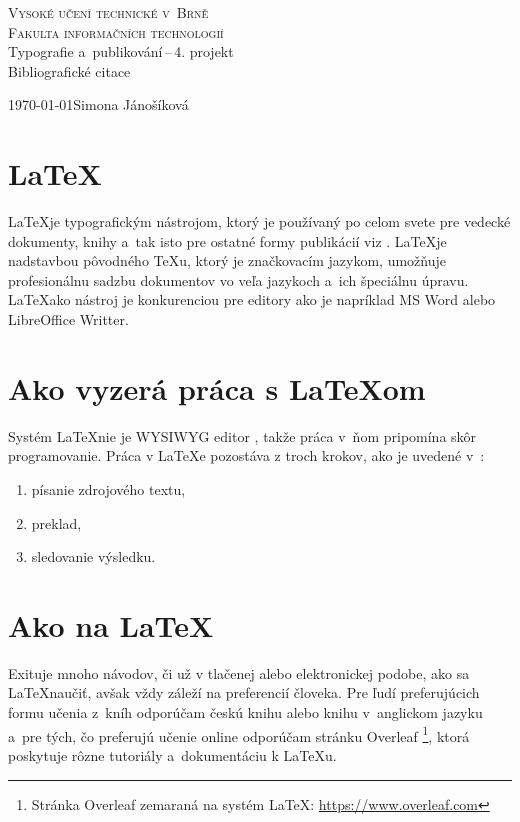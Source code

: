\documentclass[a4paper, 11pt]{article}
\begin{document}
\begin{titlepage}
    \begin{center}
       \textsc {\Huge{Vysoké učení technické v~Brně}\\
                \huge{Fakulta informačních technologií}\\}
        {\LARGE Typografie a~publikování\,--\,4. projekt\\[0.3em]}
        {\Huge Bibliografické citace}
    \end{center}
    {\Large \today \hfill Simona Jánošíková}
\end{titlepage}

\section{\LaTeX}
\LaTeX\:je typografickým nástrojom, ktorý je používaný po celom svete pre vedecké dokumenty, knihy a~tak isto pre ostatné formy publikácií viz \cite{OnlineOverleaf}. \LaTeX\:je nadstavbou pôvodného \TeX u, ktorý je značkovacím jazykom, umožňuje profesionálnu sadzbu dokumentov vo veľa jazykoch a~ich špeciálnu úpravu. \LaTeX\:ako nástroj je konkurenciou pre editory ako je napríklad MS Word alebo LibreOffice Writter. \cite{DiplPracSokol}

\section{Ako vyzerá práca s \LaTeX om}
Systém \LaTeX\:nie je WYSIWYG editor \cite{OnlineWyswing}, takže práca v~ňom pripomína skôr programovanie. Práca v \LaTeX e pozostáva z troch krokov, ako je uvedené v~\cite{KnihaRybicka}:
\begin{enumerate}
    \item písanie zdrojového textu,
    \item preklad,
    \item sledovanie výsledku.
\end{enumerate}

\section{Ako na \LaTeX}
Exituje mnoho návodov, či už v tlačenej alebo elektronickej podobe, ako sa \LaTeX\:naučiť, avšak vždy záleží na preferencií človeka. Pre ľudí preferujúcich formu učenia z~kníh odporúčam českú knihu  \cite{KnihaRybicka} alebo knihu v~anglickom jazyku  \cite{KnihaLearningLatex} a~pre tých, čo preferujú učenie online odporúčam stránku Overleaf \footnote{Stránka Overleaf zemaraná na systém \LaTeX\:: \href{https://www.overleaf.com}{https://www.overleaf.com}}, ktorá poskytuje rôzne tutoriály a~dokumentáciu k \LaTeX u.
\end{document}
